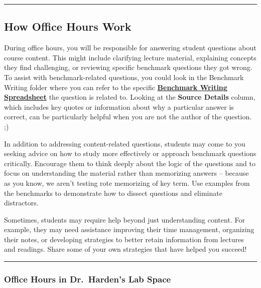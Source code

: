 \documentclass[
]{article}
\begin{document}
\begin{center}\rule{0.5\linewidth}{0.5pt}\end{center}

\hypertarget{how-office-hours-work}{%
\subsection{How Office Hours Work}\label{how-office-hours-work}}

During office hours, you will be responsible for answering student questions about course content. This might include clarifying lecture material, explaining concepts they find challenging, or reviewing specific benchmark questions they got wrong. To assist with benchmark-related questions, you could look in the Benchmark Writing folder where you can refer to the specific \href{https://drive.google.com/drive/u/2/folders/1bng_NaPPPm0RomhilhfiZkOEFT6XKk87}{\textbf{Benchmark Writing Spreadsheet}} the question is related to. Looking at the \textbf{Source Details} column, which includes key quotes or information about why a particular answer is correct, can be particularly helpful when you are not the author of the question. ;)

In addition to addressing content-related questions, students may come to you seeking advice on how to study more effectively or approach benchmark questions critically. Encourage them to think deeply about the logic of the questions and to focus on understanding the material rather than memorizing answers -- because as you know, we aren't testing rote memorizing of key term. Use examples from the benchmarks to demonstrate how to dissect questions and eliminate distractors.

Sometimes, students may require help beyond just understanding content. For example, they may need assistance improving their time management, organizing their notes, or developing strategies to better retain information from lectures and readings. Share some of your own strategies that have helped you succeed!

\begin{center}\rule{0.5\linewidth}{0.5pt}\end{center}

\hypertarget{office-hours-in-dr-hardens-lab-space}{%
\subsubsection*{Office Hours in Dr.~Harden's Lab Space}\label{office-hours-in-dr-hardens-lab-space}}
\end{document}
